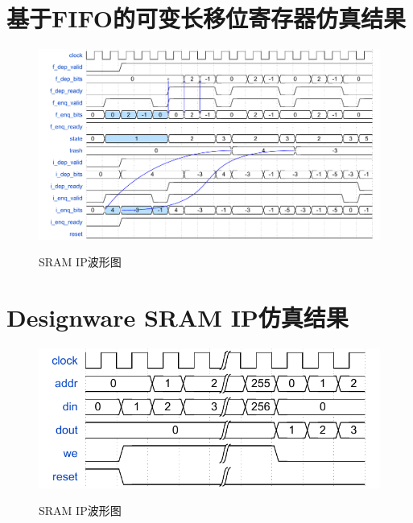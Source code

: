 \section{基于FIFO的可变长移位寄存器仿真结果}
\begin{figure}[h]
    \centering
    \includegraphics[scale=0.7]{../pdf/shift_w.pdf}\\
    \caption{SRAM IP波形图}
\end{figure}

\section{Designware SRAM IP仿真结果}
\begin{figure}[h]
    \centering
    \includegraphics{../pdf/sram_w.pdf}\\
    \caption{SRAM IP波形图}
\end{figure}

